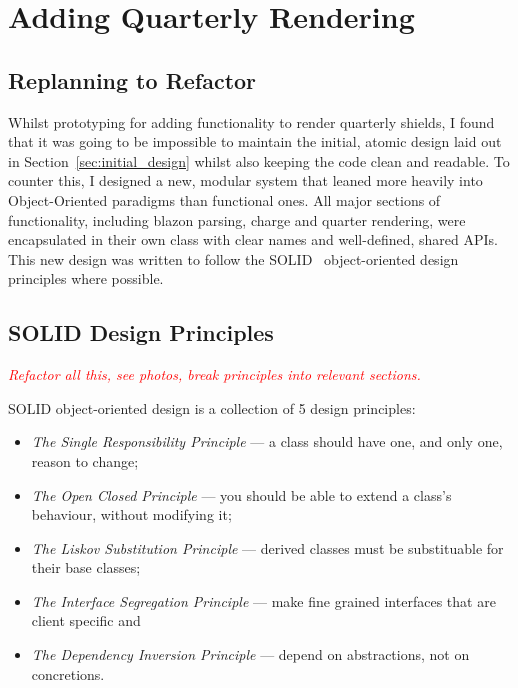 \documentclass[nobib, a4paper, twoside, justified]{tufte-book}
\makeatletter
\newcommand{\charge}{\gls{charge}\@\xspace}
\newcommand{\todo}[1]{{\noindent\textcolor{Red}{\textit{\quad#1}}\par}}
\makeatother
\begin{document}
\section{Adding Quarterly Rendering}%
\label{sec:adding_quarterly_rendering}

\subsection{Replanning to Refactor}%
\label{sub:replanning_to_refactor}

Whilst prototyping for adding functionality to render quarterly shields, I found that it was going
to be impossible to maintain the initial, atomic design laid out in
Section~\ref{sec:initial_design} whilst also keeping the code clean and readable. To counter this,
I designed a new, modular system that leaned more heavily into Object-Oriented paradigms than
functional ones. All major sections of functionality, including \gls{blazon} parsing, \charge{} and
quarter rendering, were encapsulated in their own class with clear names and well-defined, shared
APIs. This new design was written to follow the SOLID~\autocite{martin2000design} object-oriented
design principles where possible.

\subsection{SOLID Design Principles}%
\label{sub:solid_design_principles}

\todo{Refactor all this, see photos, break principles into relevant sections.}

SOLID object-oriented design is a collection of 5 design principles:

\begin{itemize}
  \item \textit{The Single Responsibility Principle} --- a class should have one, and only one,
    reason to change;
  \item \textit{The Open Closed Principle} --- you should be able to extend a class's behaviour,
    without modifying it;
  \item \textit{The Liskov Substitution Principle} --- derived classes must be substituable for
    their base classes;
  \item \textit{The Interface Segregation Principle} --- make fine grained interfaces that are
    client specific and
  \item \textit{The Dependency Inversion Principle} --- depend on abstractions, not on concretions.
\end{itemize}
\end{document}
